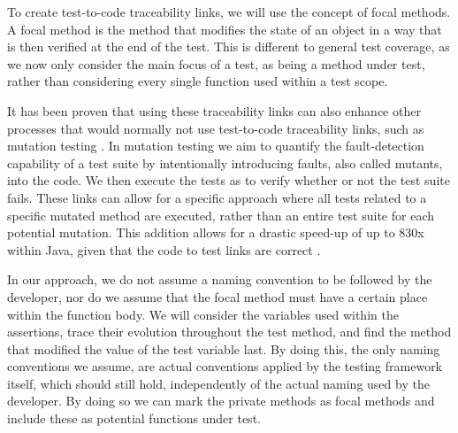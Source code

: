 \documentclass[11pt]{article}
\begin{document}
\begin{multicols}{2}
To create test-to-code traceability links, we will use the concept of focal methods. A focal method is the method that modifies the state of an object in a way that is then verified at the end of the test\cite{10.1145/3278186.3278190}. This is different to general test coverage, as we now only consider the main focus of a test, as being a method under test, rather than considering every single function used within a test scope.

It has been proven that using these traceability links can also enhance other processes that would normally not use test-to-code traceability links, such as mutation testing \cite{10.1145/3278186.3278190}. In mutation testing we aim to quantify the fault-detection capability of a test suite by intentionally introducing faults, also called mutants, into the code. We then execute the tests as to verify whether or not the test suite fails. These links can allow for a specific approach where all tests related to a specific mutated method are executed, rather than an entire test suite for each potential mutation. This addition allows for a drastic speed-up of up to 830x within Java, given that the code to test links are correct \cite{10.1145/3278186.3278190}.

In our approach, we do not assume a naming convention to be followed by the developer, nor do we assume that the focal method must have a certain place within the function body. We will consider the variables used within the assertions, trace their evolution throughout the test method, and find the method that modified the value of the test variable last. By doing this, the only naming conventions we assume, are actual conventions applied by the testing framework itself, which should still hold, independently of the actual naming used by the developer. By doing so we can mark the private methods as focal methods and include these as potential functions under test.


\end{multicols}
\end{document}
